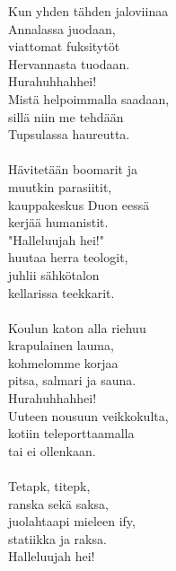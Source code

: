 
            Kun yhden tähden jaloviinaa \\
            Annalassa juodaan, \\
            viattomat fuksitytöt \\
            Hervannasta tuodaan. \\
            Hurahuhhahhei! \\
            Mistä helpoimmalla saadaan, \\
            sillä niin me tehdään \\
            Tupsulassa haureutta. \\
\hspace{10mm} \\
            Hävitetään boomarit ja \\
            muutkin parasiitit, \\
            kauppakeskus Duon eessä \\
            kerjää humanistit. \\
            "Halleluujah hei!" \\
            huutaa herra teologit, \\
            juhlii sähkötalon \\
            kellarissa teekkarit. \\
\hspace{10mm} \\
            Koulun katon alla riehuu \\
            krapulainen lauma, \\
            kohmelomme korjaa \\
            pitsa, salmari ja sauna. \\
            Hurahuhhahhei! \\
            Uuteen nousuun veikkokulta, \\
            kotiin teleporttaamalla \\
            tai ei ollenkaan. \\
\hspace{10mm} \\
            Tetapk, titepk, \\
            ranska sekä saksa, \\
            juolahtaapi mieleen ify, \\
            statiikka ja raksa. \\
            Halleluujah hei! \\
